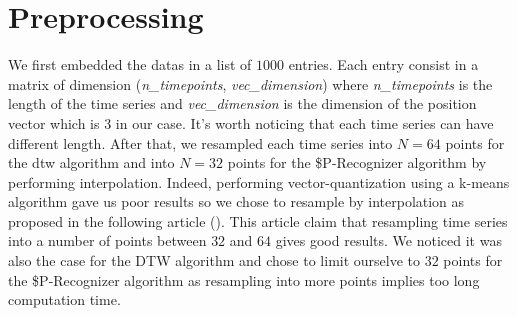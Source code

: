 \section{Preprocessing}

We first embedded the datas in a list of $1000$ entries. Each entry consist in a matrix of dimension (\textit{n\_timepoints}, \textit{vec\_dimension}) where \textit{n\_timepoints} is the length of the time series and \textit{vec\_dimension} is the dimension of the position vector which is $3$ in our case. It's worth noticing that each time series can have different length. 
After that, we resampled each time series into $N = 64$ points for the dtw algorithm and into $N=32$ points for the \$P-Recognizer algorithm by performing interpolation. Indeed, performing vector-quantization using a k-means algorithm gave us poor results so we chose to resample by interpolation as proposed in the following article (\cite{Wobbrock_Wilson_Li_2007}). This article claim that resampling time series into a number of points between $32$ and $64$ gives good results. We noticed it was also the case for the DTW algorithm and chose to limit ourselve to $32$ points for the \$P-Recognizer algorithm as resampling into more points implies too long computation time.